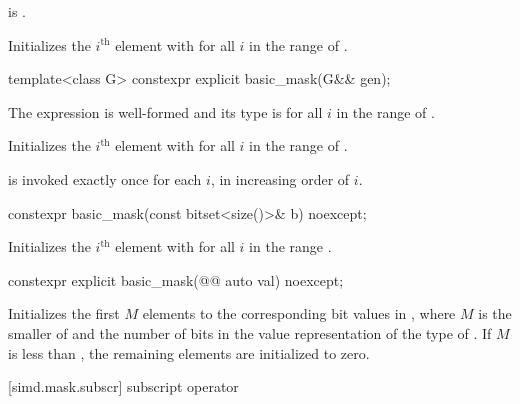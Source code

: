 \begin{itemdescr}
\pnum
\constraints
{} is
.

\pnum
\effects
Initializes the $i^\text{th}$ element with  for all $i$ in the
range of .
\end{itemdescr}

\begin{itemdecl}
template<class G> constexpr explicit basic_mask(G&& gen);
\end{itemdecl}

\begin{itemdescr}
\pnum
\constraints
The expression  is
well-formed and its type is  for all $i$ in the range of
.

\pnum
\effects
Initializes the $i^\text{th}$ element with
 for all $i$ in
the range of .

\pnum
\remarks
{} is invoked exactly once for each $i$, in increasing order of $i$.
\end{itemdescr}

\begin{itemdecl}
constexpr basic_mask(const bitset<size()>& b) noexcept;
\end{itemdecl}

\begin{itemdescr}
\pnum
\effects
Initializes the $i^\text{th}$ element with  for all $i$ in the
range .
\end{itemdescr}

\begin{itemdecl}
constexpr explicit basic_mask(@@ auto val) noexcept;
\end{itemdecl}

\begin{itemdescr}
\pnum
\effects
Initializes the first $M$ elements to the corresponding bit values in
, where $M$ is the smaller of  and the number of bits in
the value representation of the type of . If
$M$ is less than , the remaining elements are initialized to
zero.
\end{itemdescr}

[simd.mask.subscr]{ subscript operator}

